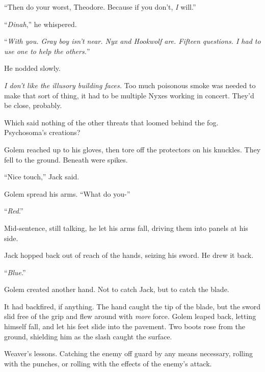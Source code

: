 ``Then do your worst, Theodore.  Because if you don't, \emph{I }will.''



``\emph{Dinah},'' he whispered.



``\emph{With you.  Gray boy isn't near.  Nyx and Hookwolf are.  Fifteen questions.  I had to use one to help the others.}''



He nodded slowly.



\emph{I don't like the illusory building faces.  }Too much poisonous smoke was needed to make that sort of thing, it had to be multiple Nyxes working in concert.  They'd be close, probably.



Which said nothing of the other threats that loomed behind the fog.  Psychosoma's creations?



Golem reached up to his gloves, then tore off the protectors on his knuckles.  They fell to the ground.  Beneath were spikes.



``Nice touch,'' Jack said.



Golem spread his arms.  ``What do you-''



``\emph{Red}.''



Mid-sentence, still talking, he let his arms fall, driving them into panels at his side.



Jack hopped back out of reach of the hands, seizing his sword.  He drew it back.



``\emph{Blue}.''



Golem created another hand.  Not to catch Jack, but to catch the blade.



It had backfired, if anything.  The hand caught the tip of the blade, but the sword slid free of the grip and flew around with \emph{more} force.  Golem leaped back, letting himself fall, and let his feet slide into the pavement.  Two boots rose from the ground, shielding him as the slash caught the surface.



Weaver's lessons.  Catching the enemy off guard by any means necessary, rolling with the punches, or rolling with the effects of the enemy's attack.



